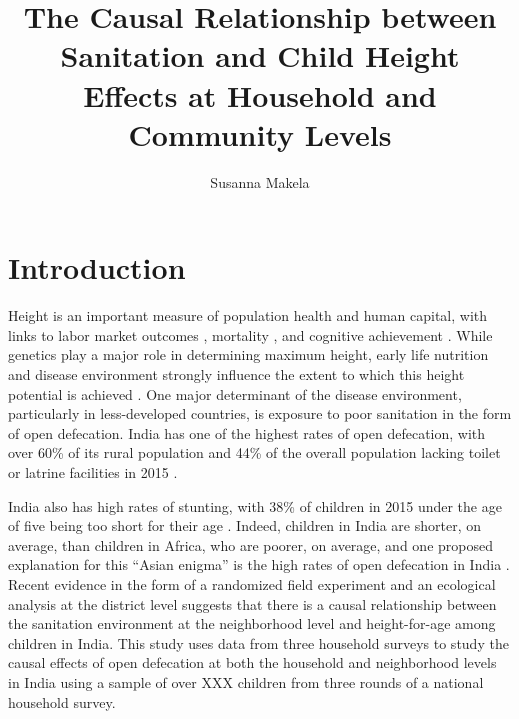 \documentclass[12pt,a4paper,titlepage]{article}
\author{Susanna Makela}
\title{The Causal Relationship between Sanitation and Child Height \\
		\Large Effects at Household and Community Levels}
\begin{document}
\maketitle
\singlespacing

\section{Introduction}
Height is an important measure of population health and human capital, with links to labor market outcomes \citep{case_paxson, vogl}, mortality \citep{jousilahti}, and cognitive achievement \citep{spears2012}. While genetics play a major role in determining maximum height, early life nutrition and disease environment strongly influence the extent to which this height potential is achieved \citep{humphrey}. One major determinant of the disease environment, particularly in less-developed countries, is exposure to poor sanitation in the form of open defecation. India has one of the highest rates of open defecation, with over 60\% of its rural population and 44\% of the overall population lacking toilet or latrine facilities in 2015 \citep{jmp_2015}.

India also has high rates of stunting, with 38\% of children in 2015 under the age of five being too short for their age \citep{nfhs4_factsheet}. Indeed, children in India are shorter, on average, than children in Africa, who are poorer, on average, and one proposed explanation for this ``Asian enigma'' is the high rates of open defecation in India \citep{spears_intl_variation}. Recent evidence in the form of a randomized field experiment \citep{village_san} and an ecological analysis at the district level \citep{ecological} suggests that there is a causal relationship between the sanitation environment at the neighborhood level and height-for-age among children in India. This study uses data from three household surveys to study the causal effects of open defecation at both the household and neighborhood levels in India using a sample of over XXX children from three rounds of a national household survey.
\end{document}
